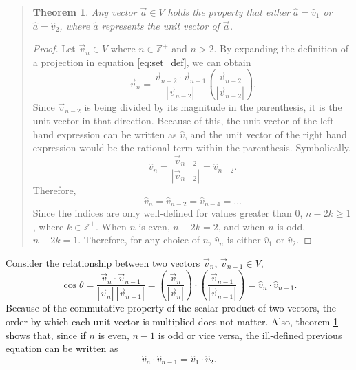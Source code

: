 \documentclass{article}
\newtheorem{theorem}{Theorem}
\begin{document}
\begin{quote}
\begin{theorem} \label{thm:first}
Any vector $\vec{a}\in V$ holds the property that either $\hat{a}=\hat{v}_1$ or $\hat{a}=\hat{v}_2$, where $\hat{a}$ represents the unit vector of $\vec{a}$.
\end{theorem}

\begin{proof}
Let $\vec{v}_n\in V$ where $n\in \mathbb{Z}^+$ and $n>2$. By expanding the definition of a projection in equation \ref{eq:set_def}, we can obtain
\[
    \vec{v}_n=\frac{\vec{v}_{n-2}\cdot\vec{v}_{n-1}}{|\vec{v}_{n-2}|}\left(\frac{\vec{v}_{n-2}}{|\vec{v}_{n-2}|}\right).
\]
Since $\vec{v}_{n-2}$ is being divided by its magnitude in the parenthesis, it is the unit vector in that direction. Because of this, the unit vector of the left hand expression can be written as $\hat{v}$, and the unit vector of the right hand expression would be the rational term within the parenthesis. Symbolically,
\[
    \hat{v}_n=\frac{\vec{v}_{n-2}}{|\vec{v}_{n-2}|}=\hat{v}_{n-2}.
\]
Therefore,
\[
    \hat{v}_n=\hat{v}_{n-2}=\hat{v}_{n-4}=\dots
\]
Since the indices are only well-defined for values greater than $0$, $n-2k\geq1$, where $k\in \mathbb{Z}^+$. When $n$ is even, $n-2k=2$, and when $n$ is odd, $n-2k=1$. Therefore, for any choice of $n$, $\hat{v}_n$ is either $\hat{v}_1$ or $\hat{v}_2$.

\end{proof}
\end{quote}

Consider the relationship between two vectors $\vec{v}_n,\, \vec{v}_{n-1} \in V$,
\begin{equation} \label{eq:cos}
    \cos\theta = \frac{ \vec{v}_n \cdot \vec{v}_{n-1} }{ |\vec{v}_n|\:|\vec{v}_{n-1}| } = \left(\frac{\vec{v}_n}{|\vec{v}_n|}\right) \cdot \left(\frac{\vec{v}_{n-1}}{|\vec{v}_{n-1}|}\right)=\hat{v}_n \cdot \hat{v}_{n-1}.
\end{equation}
Because of the commutative property of the scalar product of two vectors, the order by which each unit vector is multiplied does not matter. Also, theorem \ref{thm:first} shows that, since if $n$ is even, $n-1$ is odd or vice versa, the ill-defined previous equation can be written as
\begin{equation} \label{eq:dotprod1}
    \hat{v}_n \cdot \hat{v}_{n-1} = \hat{v}_1 \cdot \hat{v}_2.
\end{equation}
\end{document}
